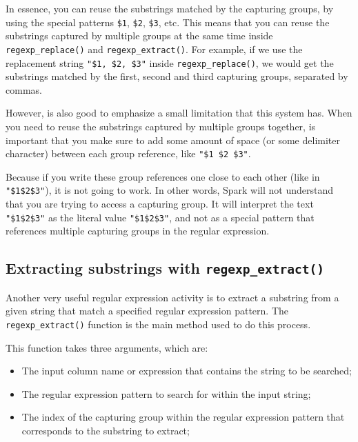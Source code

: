 \documentclass[
  11pt,
  letterpaper,
  DIV=11,
  numbers=noendperiod]{scrreprt}
\providecommand{\tightlist}{%
  \setlength{\itemsep}{0pt}\setlength{\parskip}{0pt}}\usepackage{longtable,booktabs,array}
\begin{document}
In essence, you can reuse the substrings matched by the capturing
groups, by using the special patterns \texttt{\$1}, \texttt{\$2},
\texttt{\$3}, etc. This means that you can reuse the substrings captured
by multiple groups at the same time inside \texttt{regexp\_replace()}
and \texttt{regexp\_extract()}. For example, if we use the replacement
string \texttt{"\$1,\ \$2,\ \$3"} inside \texttt{regexp\_replace()}, we
would get the substrings matched by the first, second and third
capturing groups, separated by commas.

However, is also good to emphasize a small limitation that this system
has. When you need to reuse the substrings captured by multiple groups
together, is important that you make sure to add some amount of space
(or some delimiter character) between each group reference, like
\texttt{"\$1\ \$2\ \$3"}.

Because if you write these group references one close to each other
(like in \texttt{"\$1\$2\$3"}), it is not going to work. In other words,
Spark will not understand that you are trying to access a capturing
group. It will interpret the text \texttt{"\$1\$2\$3"} as the literal
value \texttt{"\$1\$2\$3"}, and not as a special pattern that references
multiple capturing groups in the regular expression.

\hypertarget{sec-regexp-extract}{%
\subsection{\texorpdfstring{Extracting substrings with
\texttt{regexp\_extract()}}{Extracting substrings with regexp\_extract()}}\label{sec-regexp-extract}}

Another very useful regular expression activity is to extract a
substring from a given string that match a specified regular expression
pattern. The \texttt{regexp\_extract()} function is the main method used
to do this process.

This function takes three arguments, which are:

\begin{itemize}
\tightlist
\item
  The input column name or expression that contains the string to be
  searched;
\item
  The regular expression pattern to search for within the input string;
\item
  The index of the capturing group within the regular expression pattern
  that corresponds to the substring to extract;
\end{itemize}
\end{document}
